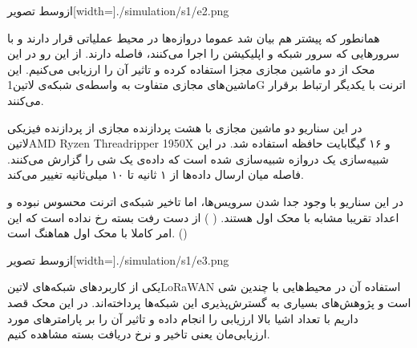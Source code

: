 ‌ازوسط
‌تصویر[width=\textwidth]{./simulation/s1/e2.png}


همانطور که پیشتر هم بیان شد عموما دروازه‌ها در محیط عملیاتی قرار دارند و با سرورهایی که سرور شبکه
و اپلیکیشن را اجرا می‌کنند، فاصله دارند. از این رو در این محک از دو ماشین مجازی مجزا استفاده کرده و تاثیر آن را ارزیابی می‌کنیم.
این ماشین‌های مجازی متفاوت به واسطه‌ی شبکه‌ی ‌لاتین{1G} اترنت با یکدیگر ارتباط برقرار می‌کنند.

در این سناریو دو ماشین مجازی با هشت پردازنده مجازی از پردازنده فیزیکی
‌لاتین{AMD Ryzen Threadripper 1950X}
و ۱۶ گیگابایت حافظه استفاده شد.
در این شبیه‌سازی یک دروازه شبیه‌سازی شده است که داده‌ی یک شی را گزارش می‌کنند. فاصله میان ارسال داده‌ها از ۱ ثانیه تا ۱۰ میلی‌ثانیه تغییر می‌کند.

در این سناریو با وجود جدا شدن سرویس‌ها، اما تاخیر شبکه‌ی اترنت محسوس نبوده و اعداد تقریبا مشابه با محک اول هستند.
( )
از دست رفت بسته رخ نداده است که این امر کاملا با محک اول هماهنگ است. ()

‌ازوسط
‌تصویر[width=\textwidth]{./simulation/s1/e3.png}


یکی از کاربردهای شبکه‌های ‌لاتین{LoRaWAN} استفاده آن در محیط‌هایی با چندین شی است و پژوهش‌های بسیاری به گسترش‌پذیری این شبکه‌ها پرداخته‌اند.
در این محک قصد داریم با تعداد اشیا بالا ارزیابی را انجام داده و تاثیر آن را بر پارامترهای مورد ارزیابی‌مان یعنی تاخیر و نرخ دریافت بسته مشاهده کنیم.

